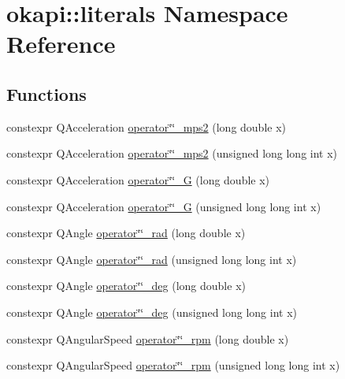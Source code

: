 \hypertarget{namespaceokapi_1_1literals}{}\section{okapi\+::literals Namespace Reference}
\label{namespaceokapi_1_1literals}
\subsection*{Functions}
\begin{DoxyCompactItemize}
\item 
constexpr Q\+Acceleration \mbox{\hyperlink{namespaceokapi_1_1literals_a7aa45f65867b1b8c864d0c600a7a4cbc}{operator\char`\"{}\char`\"{}\+\_\+mps2}} (long double x)
\item 
constexpr Q\+Acceleration \mbox{\hyperlink{namespaceokapi_1_1literals_a7eada23b332074941b1264ffe7b65035}{operator\char`\"{}\char`\"{}\+\_\+mps2}} (unsigned long long int x)
\item 
constexpr Q\+Acceleration \mbox{\hyperlink{namespaceokapi_1_1literals_a5cc15340933c02ba4a590ac7cc8f2aec}{operator\char`\"{}\char`\"{}\+\_\+G}} (long double x)
\item 
constexpr Q\+Acceleration \mbox{\hyperlink{namespaceokapi_1_1literals_a41dfbc6575374e3b284f77002233f3c3}{operator\char`\"{}\char`\"{}\+\_\+G}} (unsigned long long int x)
\item 
constexpr Q\+Angle \mbox{\hyperlink{namespaceokapi_1_1literals_a07f1b869e43b86032c308adad74d32fe}{operator\char`\"{}\char`\"{}\+\_\+rad}} (long double x)
\item 
constexpr Q\+Angle \mbox{\hyperlink{namespaceokapi_1_1literals_a81747a819272e667c22af7e4b6964de9}{operator\char`\"{}\char`\"{}\+\_\+rad}} (unsigned long long int x)
\item 
constexpr Q\+Angle \mbox{\hyperlink{namespaceokapi_1_1literals_afc22181ee7d38722369c5f4cb685e641}{operator\char`\"{}\char`\"{}\+\_\+deg}} (long double x)
\item 
constexpr Q\+Angle \mbox{\hyperlink{namespaceokapi_1_1literals_abbb7d5973f364cb7d6778d14409693eb}{operator\char`\"{}\char`\"{}\+\_\+deg}} (unsigned long long int x)
\item 
constexpr Q\+Angular\+Speed \mbox{\hyperlink{namespaceokapi_1_1literals_a32709f66612c6f9e966cab17d6a6759e}{operator\char`\"{}\char`\"{}\+\_\+rpm}} (long double x)
\item 
constexpr Q\+Angular\+Speed \mbox{\hyperlink{namespaceokapi_1_1literals_ab872fb0eb201af57679cd55f89362d0c}{operator\char`\"{}\char`\"{}\+\_\+rpm}} (unsigned long long int x)

\end{DoxyCompactItemize}
